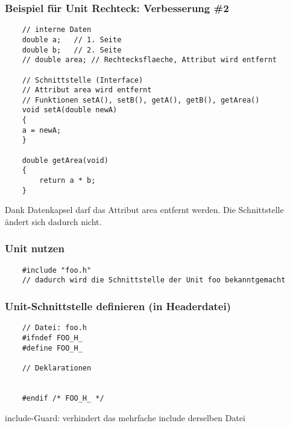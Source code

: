 \subsubsection{Beispiel für Unit Rechteck: Verbesserung \#2}
\label{sec:Beispiel fuer Unit Rechteck: Verbesserung 2}
\noindent
\begin{minipage}{\linewidth}
	\begin{lstlisting}
	// interne Daten
	double a;	// 1. Seite
	double b;	// 2. Seite
	// double area;	// Rechtecksflaeche, Attribut wird entfernt
	
	// Schnittstelle (Interface)
	// Attribut area wird entfernt
	// Funktionen setA(), setB(), getA(), getB(), getArea()
	void setA(double newA)
	{
	a = newA;
	}
	
	double getArea(void)
	{
		return a * b;
	}
	\end{lstlisting}
\end{minipage}
\begin{hinweis}
	Dank Datenkapsel darf das Attribut area entfernt werden. Die Schnittstelle ändert sich dadurch nicht.
\end{hinweis}

\subsubsection{Unit nutzen\hfill}
\label{sec:Unit nutzen}
\noindent
\begin{minipage}{\linewidth}
	\begin{lstlisting}
	#include "foo.h"
	// dadurch wird die Schnittstelle der Unit foo bekanntgemacht
	\end{lstlisting}
\end{minipage}

\subsubsection{Unit-Schnittstelle definieren (in Headerdatei)\hfill}
\label{sec:Unit-Schnittstelle definieren}
\noindent
\begin{minipage}{\linewidth}
	\begin{lstlisting}
	// Datei: foo.h
	#ifndef FOO_H_
	#define FOO_H_
	
	// Deklarationen
	
	
	#endif /* FOO_H_ */
	\end{lstlisting}
\end{minipage}
\begin{hinweis}
include-Guard: verhindert das mehrfache include derselben Datei
\end{hinweis}


